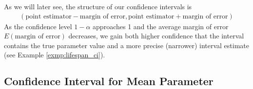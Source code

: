 As we will later see, the structure of our confidence intervals is
\begin{gather*}
    (\text{point estimator} - \text{margin of error}, \text{point estimator} + \text{margin of error})
\end{gather*}
As the confidence level \( 1 - \alpha \) approaches 1 and the average margin of error \( E(\text{margin of error}) \) decreases,
we gain both higher confidence that the interval contains the true parameter value and a more precise (narrower) interval estimate (see Example \autoref{exmp:lifespan_ci}).

\subsection{Confidence Interval for Mean Parameter}

